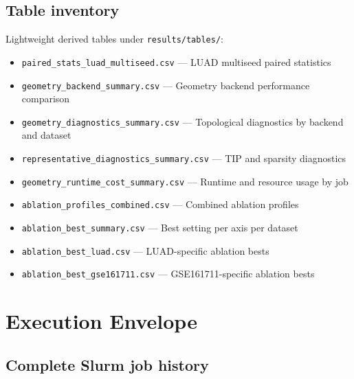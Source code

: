 \documentclass[11pt]{article}
\begin{document}
\subsection{Table inventory}
Lightweight derived tables under \texttt{results/tables/}:
\begin{itemize}[leftmargin=1.5em]
\item \texttt{paired\_stats\_luad\_multiseed.csv} --- LUAD multiseed paired statistics
\item \texttt{geometry\_backend\_summary.csv} --- Geometry backend performance comparison
\item \texttt{geometry\_diagnostics\_summary.csv} --- Topological diagnostics by backend and dataset
\item \texttt{representative\_diagnostics\_summary.csv} --- TIP and sparsity diagnostics
\item \texttt{geometry\_runtime\_cost\_summary.csv} --- Runtime and resource usage by job
\item \texttt{ablation\_profiles\_combined.csv} --- Combined ablation profiles
\item \texttt{ablation\_best\_summary.csv} --- Best setting per axis per dataset
\item \texttt{ablation\_best\_luad.csv} --- LUAD-specific ablation bests
\item \texttt{ablation\_best\_gse161711.csv} --- GSE161711-specific ablation bests
\end{itemize}

\section{Execution Envelope}

\subsection{Complete Slurm job history}
\end{document}
